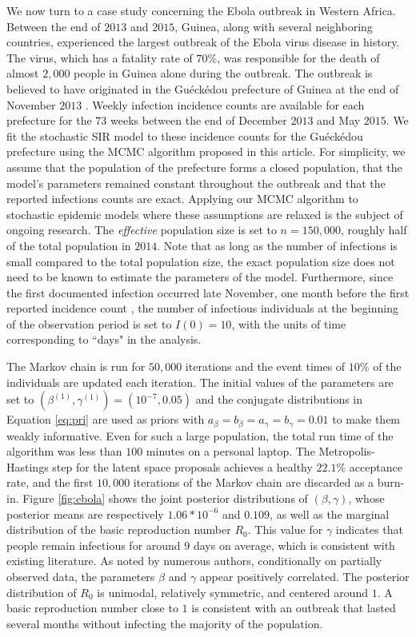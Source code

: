 \documentclass[11pt]{article}
\begin{document}
	We now turn to a case study concerning the Ebola outbreak in Western Africa.
	Between the end of $2013$ and $2015$, Guinea, along with several neighboring countries, experienced the largest outbreak of the Ebola virus disease in history. The virus, which has a fatality rate of $70\%$, was responsible for the death of almost $2,000$ people in Guinea alone during the outbreak.
	The outbreak is believed to have originated in the Gu\'eck\'edou prefecture of Guinea at the end of November $2013$ \cite{Baize.2014}. Weekly infection incidence counts are available for each prefecture for the $73$ weeks between the end of December $2013$ and May $2015$.
	We fit the stochastic SIR model to these incidence counts for the Gu\'eck\'edou prefecture using the MCMC algorithm proposed in this article.
	For simplicity, we assume that the population of the prefecture forms a closed population, that the model's parameters remained constant throughout the outbreak and that the reported infections counts are exact. Applying our MCMC algorithm to stochastic epidemic models where these assumptions are relaxed is the subject of ongoing research.
	The \textit{effective} population size is set to $n = 150,000$, roughly half of the total population in $2014$. Note that as long as the number of infections is small compared to the total population size, the exact population size does not need to be known to estimate the parameters of the model. Furthermore, since the first documented infection occurred late November, one month before the first reported incidence count \cite{Baize.2014}, the number of infectious individuals at the beginning of the observation period is set to $I(0) = 10$, with the units of time corresponding to ``days" in the analysis.
	
	The Markov chain is run for $50,000$ iterations and the event times of $10\%$ of the individuals are updated each iteration. The initial values of the parameters are set to $(\beta^{(1)}, \gamma^{(1)}) = (10^{-7}, 0.05)$ and the conjugate distributions in Equation \ref{eq:pri} are used as priors with $a_{\beta} = b_{\beta} = a_{\gamma} = b_{\gamma} = 0.01$ to make them weakly informative. Even for such a large population, the total run time of the algorithm was less than $100$ minutes on a personal laptop.
	The Metropolis-Hastings step for the latent space proposals achieves a healthy $22.1\%$ acceptance rate, and the first $10,000$ iterations of the Markov chain are discarded as a burn-in.
	Figure \ref{fig:ebola} shows the joint posterior distributions of $(\beta, \gamma)$, whose posterior means are respectively $1.06 * 10^{-6}$ and $0.109$, as well as the marginal distribution of the basic reproduction number $R_0$. This value for $\gamma$ indicates that people remain infectious for around $9$ days on average, which is consistent with existing literature. As noted by numerous authors, conditionally on partially observed data, the parameters $\beta$ and $\gamma$ appear positively correlated. The posterior distribution of $R_0$ is unimodal, relatively symmetric, and centered around $1$. A basic reproduction number close to $1$ is consistent with an outbreak that lasted several months without infecting the majority of the population.
	
\end{document}
